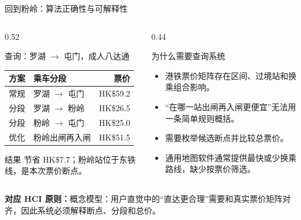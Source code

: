 \documentclass[aspectratio=169,10pt]{beamer}
\newcommand{\hciprinciple}[1]{\vspace{0.25em}\textcolor{MTRPurple}{\small\textbf{对应 HCI 原则：}#1}}
\begin{document}
\begin{frame}{回到粉岭：算法正确性与可解释性}
  \small
  \begin{columns}[T,onlytextwidth]
    \begin{column}{0.52\textwidth}
      \begin{block}{查询：罗湖 $\to$ 屯门，成人八达通}
        \begin{tabularx}{\linewidth}{lXr}
          \toprule
          方案 & 乘车分段 & 票价 \\
          \midrule
          常规 & 罗湖 $\to$ 屯门 & HK\$59.2 \\
          分段 & 罗湖 $\to$ 粉岭 & HK\$26.5 \\
          分段 & 粉岭 $\to$ 屯门 & HK\$25.0 \\
          \midrule
          优化 & 粉岭出闸再入闸 & HK\$51.5 \\
          \bottomrule
        \end{tabularx}
      \end{block}
      \begin{block}{结果}
        节省 HK\$7.7；粉岭站位于东铁线，是本次票价断点。
      \end{block}
    \end{column}
    \begin{column}{0.44\textwidth}
      \begin{block}{为什么需要查询系统}
        \begin{itemize}
          \item 港铁票价矩阵存在区间、过境站和换乘组合影响。
          \item “在哪一站出闸再入闸更便宜”无法用一条简单规则概括。
          \item 需要枚举候选断点并比较总票价。
          \item 通用地图软件通常提供最快或少换乘路线，缺少按票价筛选。
        \end{itemize}
      \end{block}
    \end{column}
  \end{columns}
  \hciprinciple{概念模型：用户直觉中的“直达更合理”需要和真实票价矩阵对齐，因此系统必须解释断点、分段和总价。}
\end{frame}
\end{document}
